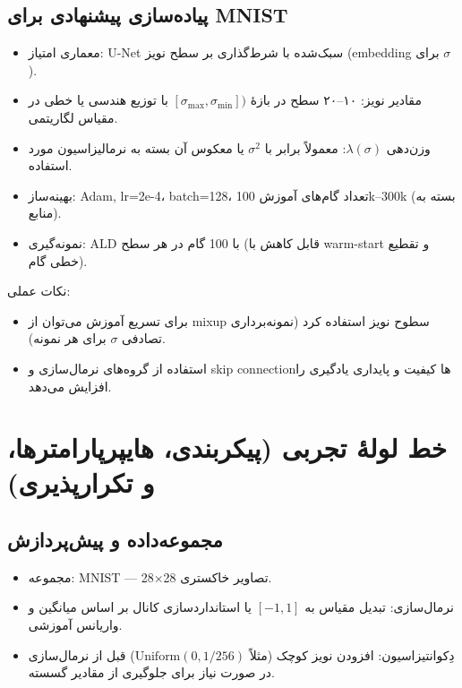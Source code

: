 \subsection{پیاده‌سازی پیشنهادی برای MNIST}
\begin{itemize}
    \item معماری امتیاز: U-Net سبک‌شده با شرط‌گذاری بر سطح نویز (embedding برای \(\sigma\)).
    \item مقادیر نویز: ۱۰–۲۰ سطح در بازهٔ \([\sigma_{\max}, \sigma_{\min}])\) با توزیع هندسی یا خطی در مقیاس لگاریتمی.
    \item وزن‌دهی \(\lambda(\sigma)\): معمولاً برابر با \(\sigma^2\) یا معکوس آن بسته به نرمالیزاسیون مورد استفاده.
    \item بهینه‌ساز: Adam, lr=2e-4، batch=128، تعداد گام‌های آموزش 100k–300k (بسته به منابع).
    \item نمونه‌گیری: ALD با 100 گام در هر سطح (قابل کاهش با warm-start و تقطیع خطی گام).
\end{itemize}

نکات عملی:
\begin{itemize}
    \item برای تسریع آموزش می‌توان از mixup سطوح نویز استفاده کرد (نمونه‌برداری تصادفی \(\sigma\) برای هر نمونه).
    \item استفاده از گروه‌های نرمال‌سازی و skip connectionها کیفیت و پایداری یادگیری را افزایش می‌دهد.
\end{itemize}

\section{خط لولهٔ تجربی (پیکربندی، هایپرپارامترها، و تکرارپذیری)}

\subsection{مجموعه‌داده و پیش‌پردازش}
\begin{itemize}
    \item مجموعه: MNIST — تصاویر خاکستری 28×28.
    \item نرمال‌سازی: تبدیل مقیاس به \([-1,1]\) یا استانداردسازی کانال بر اساس میانگین و واریانس آموزشی.
    \item دِکوانتیزاسیون: افزودن نویز کوچک (مثلاً \(\text{Uniform}(0,1/256)\)) قبل از نرمال‌سازی در صورت نیاز برای جلوگیری از مقادیر گسسته.
\end{itemize}

